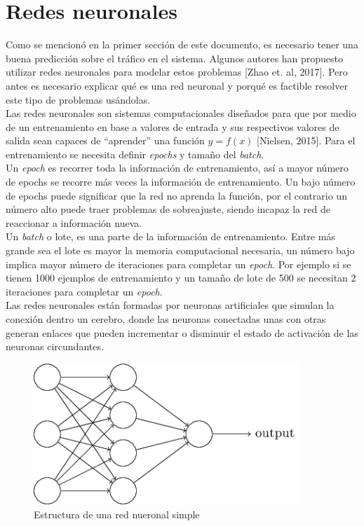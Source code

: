 \documentclass[12pt,spanish]{article}
\begin{document}
	\section{Redes neuronales}
	Como se mencionó en la primer sección de este documento, es necesario tener una buena predicción sobre el tráfico en el sistema. Algunos autores han propuesto utilizar redes neuronales para modelar estos problemas [Zhao et. al, 2017]. Pero antes es necesario explicar qué es una red neuronal y porqué es factible resolver este tipo de problemas usándolas.\\
	Las redes neuronales son sistemas computacionales diseñados para que por medio de un entrenamiento en base a valores de entrada y sus respectivos valores de salida sean capaces de ``aprender'' una función $ y = f(x) $ [Nielsen, 2015]. Para el entrenamiento se necesita definir \textit{epochs} y tamaño del \textit{batch}.\\
	Un \textit{epoch} es recorrer toda la información de entrenamiento, así a mayor número de epochs se recorre más veces la información de entrenamiento. Un bajo número de epochs puede significar que la red no aprenda la función, por el contrario un número alto puede traer problemas de sobreajuste, siendo incapaz la red de reaccionar a información nueva.\\
	Un \textit{batch} o lote, es una parte de la información de entrenamiento. Entre más grande sea el lote es mayor la memoria computacional necesaria, un número bajo implica mayor número de iteraciones para completar un \textit{epoch}. Por ejemplo si se tienen 1000 ejemplos de entrenamiento y un tamaño de lote de 500 se necesitan 2 iteraciones para completar un \textit{epoch}.\\
	Las redes neuronales están formadas por neuronas artificiales que simulan la conexión dentro un cerebro, donde las neuronas conectadas unas con otras generan enlaces que pueden incrementar o disminuir el estado de activación de las neuronas circundantes. 
	\begin{figure}[H]
		\centering
		\includegraphics[width=10cm]{Imagenes/neural_network_structure.png}
		\begin{centering}
			\caption{Estructura de una red nueronal simple}
		\end{centering}
	\end{figure}
	
\end{document}
